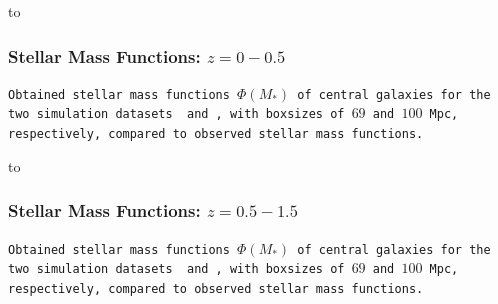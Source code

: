 {
    {\vbox to }
    \begin{frame}
        \frametitle{Stellar Mass Functions: $z=0-0.5$}
        \vspace{6.5cm}
        \tiny\texttt{Obtained stellar mass functions $\Phi(M_*)$ of central galaxies for the two simulation datasets \gsmall\ and \glarge, with boxsizes of $69$ and $100$ Mpc, respectively, compared to observed stellar mass functions.
        }
    \end{frame}
}

{
    {\vbox to }
    \begin{frame}
        \frametitle{Stellar Mass Functions: $z=0.5-1.5$}
        \vspace{6.5cm}
        \tiny\texttt{Obtained stellar mass functions $\Phi(M_*)$ of central galaxies for the two simulation datasets \gsmall\ and \glarge, with boxsizes of $69$ and $100$ Mpc, respectively, compared to observed stellar mass functions.
        }
    \end{frame}
}

